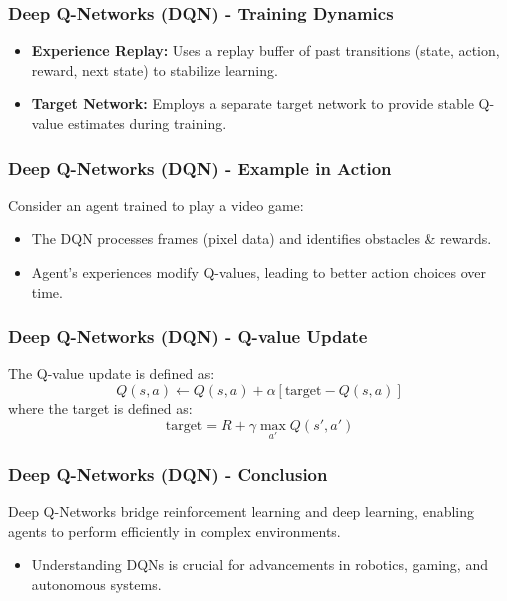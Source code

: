 \documentclass[aspectratio=169]{beamer}
\begin{document}
\begin{frame}[fragile]
    \frametitle{Deep Q-Networks (DQN) - Training Dynamics}
    \begin{itemize}
        \item \textbf{Experience Replay:} Uses a replay buffer of past transitions (state, action, reward, next state) to stabilize learning.
        \item \textbf{Target Network:} Employs a separate target network to provide stable Q-value estimates during training.
    \end{itemize}
\end{frame}

\begin{frame}[fragile]
    \frametitle{Deep Q-Networks (DQN) - Example in Action}
    Consider an agent trained to play a video game:
    \begin{itemize}
        \item The DQN processes frames (pixel data) and identifies obstacles & rewards.
        \item Agent's experiences modify Q-values, leading to better action choices over time.
    \end{itemize}
\end{frame}

\begin{frame}[fragile]
    \frametitle{Deep Q-Networks (DQN) - Q-value Update}
    The Q-value update is defined as:
    \begin{equation}
        Q(s, a) \leftarrow Q(s, a) + \alpha \left[\text{target} - Q(s, a)\right]
    \end{equation}
    where the target is defined as:
    \begin{equation}
        \text{target} = R + \gamma \max_{a'} Q(s', a')
    \end{equation}
\end{frame}

\begin{frame}[fragile]
    \frametitle{Deep Q-Networks (DQN) - Conclusion}
    Deep Q-Networks bridge reinforcement learning and deep learning, enabling agents to perform efficiently in complex environments.
    \begin{itemize}
        \item Understanding DQNs is crucial for advancements in robotics, gaming, and autonomous systems.
    \end{itemize}
\end{frame}
\end{document}
